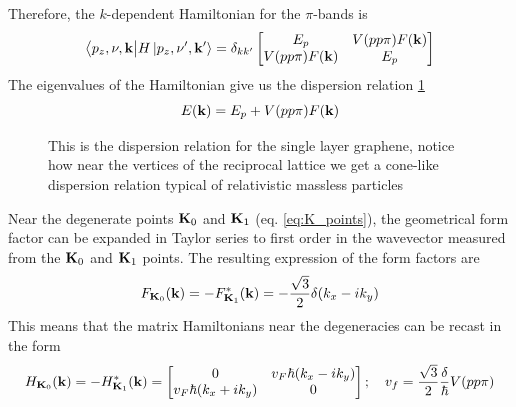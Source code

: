 Therefore, the $k$-dependent Hamiltonian for the $\pi$-bands is 
\begin{equation}
    \big\langle p_z,\nu,\mathbf{k}\big|H\ket{p_z,\nu',\mathbf{k}'}=\delta_{kk'}
    \begin{bmatrix}
        E_p & V(pp\pi)F(\mathbf{k})\\
        V(pp\pi)F(\mathbf{k}) & E_p
    \end{bmatrix}
\end{equation}
The eigenvalues of the Hamiltonian give us the dispersion relation \ref{fig:graphenedispersion}
\begin{equation}
    E(\mathbf{k})=E_p+V(pp\pi)F(\mathbf{k})
\end{equation}
\begin{figure}[h]
    \caption{This is the dispersion relation for the single layer graphene, notice how near the vertices of the reciprocal lattice we get a cone-like dispersion relation typical of relativistic massless particles \cite{guinea2008review}}
    \label{fig:graphenedispersion}
\end{figure}
Near the degenerate points $\mathbf{K}_0$ and $\mathbf{K}_1$ (eq. \ref{eq:K_points}), the geometrical form factor can be expanded in Taylor series to first order in the wavevector measured from the $\mathbf{K}_0$ and $\mathbf{K}_1$ points. The resulting expression of the form factors are
\begin{equation}
    F_{\mathbf{K}_0}(\mathbf{k})=-F^*_{\mathbf{K}_1}(\mathbf{k})= -\frac{\sqrt 3}2 \delta (k_x-ik_y)
\end{equation}
This means that the matrix Hamiltonians near the degeneracies can be recast in the form
\begin{equation}
    H_{\mathbf{K}_0}(\mathbf{k})=
    -H^*_{\mathbf{K}_1}(\mathbf{k})=
    \begin{bmatrix}
        0&v_F\hbar(k_x-ik_y)\\
        v_F\hbar(k_x+ik_y)&0
    \end{bmatrix};\quad
    v_f=\frac{\sqrt 3}2 \frac\delta \hbar V(pp\pi)
    \label{eq:dirac_Hamiltonian}
\end{equation}

